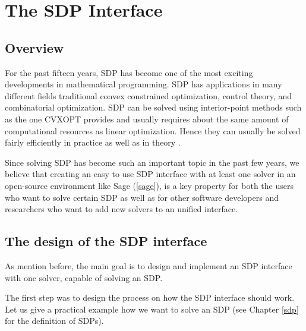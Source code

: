 
\chapter{The SDP Interface} %

\label{Chapter3} %



\section{Overview}
For the past fifteen years, SDP has become one of the most exciting developments in mathematical programming. SDP has applications in many different fields traditional convex constrained optimization, control theory, and combinatorial optimization. SDP can be solved using interior-point methods such as the one CVXOPT provides and usually requires about the same amount of computational resources as linear optimization. Hence they can usually be solved fairly efficiently in practice as well as in theory \cite{introsdp}.

Since solving SDP has become such an important topic in the past few years, we believe that creating an easy to use SDP interface with at least one solver in an open-source environment like Sage (\ref{sage}), is a key property for both the users who want to solve certain SDP as well as for other software developers and researchers who want to add new solvers to an unified interface.  








\section{The design of the SDP interface}
\label{designsdp}
As mention before, the main goal is to design and implement an SDP interface with one solver, capable of solving an SDP.

The first step was to design the process on how the SDP interface should work. Let us give a practical example how we want to solve an SDP (see Chapter \ref{sdp} for the definition of SDPs).
 
